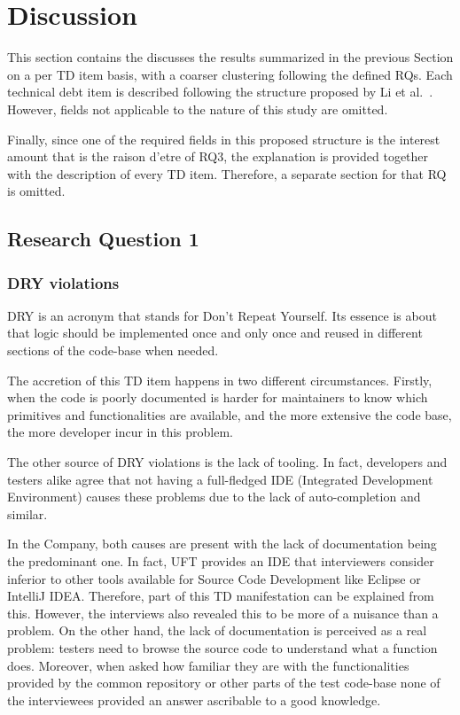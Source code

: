 \chapter{Discussion} \label{sec:discussion}

This section contains the discusses the results summarized in the previous Section on a per TD item basis, with a coarser clustering following the defined RQs. Each technical debt item is described following the structure proposed by Li et al.\ \cite{mapping_study_td}. However, fields not applicable to the nature of this study are omitted.

Finally, since one of the required fields in this proposed structure is the interest amount that is the raison d'etre of RQ3, the explanation is provided together with the description of every TD item. Therefore, a separate section for that RQ is omitted.

\section{Research Question 1} \label{sec:disc-rq1}

    \subsection{DRY violations} \label{sec:res-dry-violations}

        DRY is an acronym that stands for Don't Repeat Yourself. Its essence is about that logic should be implemented once and only once and reused in different sections of the code-base when needed.

        The accretion of this TD item happens in two different circumstances. Firstly, when the code is poorly documented is harder for maintainers to know which primitives and functionalities are available, and the more extensive the code base, the more developer incur in this problem.

        The other source of DRY violations is the lack of tooling. In fact, developers and testers alike agree that not having a full-fledged IDE (Integrated Development Environment) causes these problems due to the lack of auto-completion and similar.

        In the Company, both causes are present with the lack of documentation being the predominant one. In fact, UFT provides an IDE that interviewers consider inferior to other tools available for Source Code Development like Eclipse or IntelliJ IDEA. Therefore, part of this TD manifestation can be explained from this. However, the interviews also revealed this to be more of a nuisance than a problem. On the other hand, the lack of documentation is perceived as a real problem: testers need to browse the source code to understand what a function does. Moreover, when asked how familiar they are with the functionalities provided by the common repository or other parts of the test code-base none of the interviewees provided an answer ascribable to a good knowledge.

